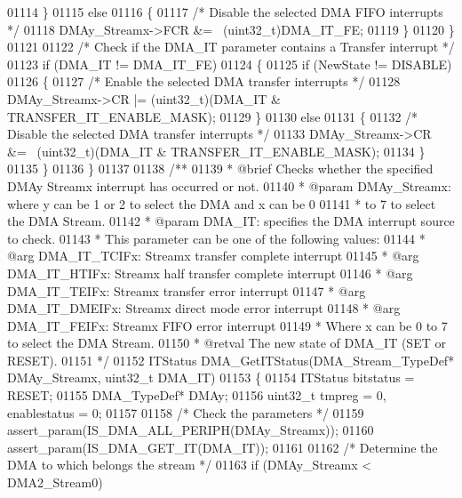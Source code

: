 \begin{DoxyCode}
01114     \}
01115     \textcolor{keywordflow}{else}
01116     \{
01117       \textcolor{comment}{/* Disable the selected DMA FIFO interrupts */}
01118       DMAy\_Streamx->FCR &= ~(uint32\_t)DMA_IT_FE;
01119     \}
01120   \}
01121 
01122   \textcolor{comment}{/* Check if the DMA\_IT parameter contains a Transfer interrupt */}
01123   \textcolor{keywordflow}{if} (DMA\_IT != DMA_IT_FE)
01124   \{
01125     \textcolor{keywordflow}{if} (NewState != DISABLE)
01126     \{
01127       \textcolor{comment}{/* Enable the selected DMA transfer interrupts */}
01128       DMAy\_Streamx->CR |= (uint32\_t)(DMA\_IT  & TRANSFER_IT_ENABLE_MASK);
01129     \}
01130     \textcolor{keywordflow}{else}
01131     \{
01132       \textcolor{comment}{/* Disable the selected DMA transfer interrupts */}
01133       DMAy\_Streamx->CR &= ~(uint32\_t)(DMA\_IT & TRANSFER_IT_ENABLE_MASK);
01134     \}
01135   \}
01136 \}
01137 
01138 \textcolor{comment}{/**}
01139 \textcolor{comment}{  * @brief  Checks whether the specified DMAy Streamx interrupt has occurred or not.}
01140 \textcolor{comment}{  * @param  DMAy\_Streamx: where y can be 1 or 2 to select the DMA and x can be 0}
01141 \textcolor{comment}{  *          to 7 to select the DMA Stream.}
01142 \textcolor{comment}{  * @param  DMA\_IT: specifies the DMA interrupt source to check.}
01143 \textcolor{comment}{  *          This parameter can be one of the following values:}
01144 \textcolor{comment}{  *            @arg DMA\_IT\_TCIFx:  Streamx transfer complete interrupt}
01145 \textcolor{comment}{  *            @arg DMA\_IT\_HTIFx:  Streamx half transfer complete interrupt}
01146 \textcolor{comment}{  *            @arg DMA\_IT\_TEIFx:  Streamx transfer error interrupt}
01147 \textcolor{comment}{  *            @arg DMA\_IT\_DMEIFx: Streamx direct mode error interrupt}
01148 \textcolor{comment}{  *            @arg DMA\_IT\_FEIFx:  Streamx FIFO error interrupt}
01149 \textcolor{comment}{  *         Where x can be 0 to 7 to select the DMA Stream.}
01150 \textcolor{comment}{  * @retval The new state of DMA\_IT (SET or RESET).}
01151 \textcolor{comment}{  */}
01152 ITStatus DMA_GetITStatus(DMA\_Stream\_TypeDef* DMAy\_Streamx, uint32\_t DMA\_IT)
01153 \{
01154   ITStatus bitstatus = RESET;
01155   DMA\_TypeDef* DMAy;
01156   uint32\_t tmpreg = 0, enablestatus = 0;
01157 
01158   \textcolor{comment}{/* Check the parameters */}
01159   assert_param(IS\_DMA\_ALL\_PERIPH(DMAy\_Streamx));
01160   assert_param(IS\_DMA\_GET\_IT(DMA\_IT));
01161 
01162   \textcolor{comment}{/* Determine the DMA to which belongs the stream */}
01163   \textcolor{keywordflow}{if} (DMAy\_Streamx < DMA2_Stream0)

\end{DoxyCode}
